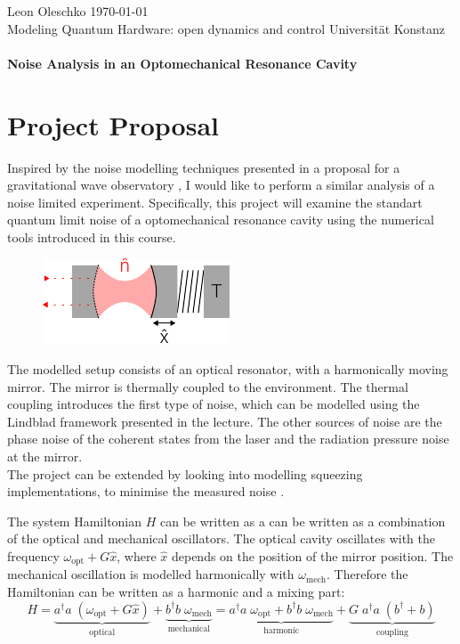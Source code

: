 \documentclass[
	a4page,
	parskip=full,
]{scrartcl}
\begin{document}
{
	\sffamily\noindent
	Leon Oleschko \hfill \today\\
	Modeling Quantum Hardware: open dynamics and control \hfill Universität Konstanz\\
	\vspace*{1cm}\\
	\textbf{\Large Noise Analysis in an Optomechanical Resonance Cavity}
}

\section*{Project Proposal}
Inspired by the noise modelling techniques presented in a proposal for a gravitational wave observatory \autocite{rainer_weiss_electronically_1972},
I would like to perform a similar analysis of a noise limited experiment.
Specifically, this project will examine the standart quantum limit noise of a optomechanical resonance cavity using the numerical tools introduced in this course.

\begin{figure}
	\includegraphics{figures/drawing.pdf}
\end{figure}
The modelled setup consists of an optical resonator, with a harmonically moving mirror.
The mirror is thermally coupled to the environment.
The thermal coupling introduces the first type of noise, which can be modelled using the Lindblad framework presented in the lecture. 
The other sources of noise are the phase noise of the coherent states from the laser and the radiation pressure noise at the mirror. \autocite{aspelmeyer_cavity_2014-1}\\
The project can be extended by looking into modelling squeezing implementations, to minimise the measured noise \autocite{aspelmeyer_cavity_2014-1}.

The system Hamiltonian $H$ can be written as a can be written as a combination of the optical and mechanical oscillators.
The optical cavity oscillates with the frequency $\omega_\text{opt} + G \hat x$, where $\hat x$ depends on the position of the mirror position.
The mechanical oscillation is modelled harmonically with $\omega_\text{mech}$.
Therefore the Hamiltonian can be written as a harmonic and a mixing part:
$$
	H = \underbrace{
		a^\dagger a\; (\omega_\text{opt} + G \hat x)
	}_{\text{optical}}+ \underbrace{
		b^\dagger b\; \omega_\text{mech}
	}_{\text{mechanical}}
	= 
	\underbrace{
			a^\dagger a\; \omega_\text{opt}
		+ b^\dagger b\; \omega_\text{mech}
	}_{\text{harmonic}}
	+ 
	\underbrace{
		G\; a^\dagger a\; (b^\dagger + b)
	}_{\text{coupling}}
$$ 
\end{document}
